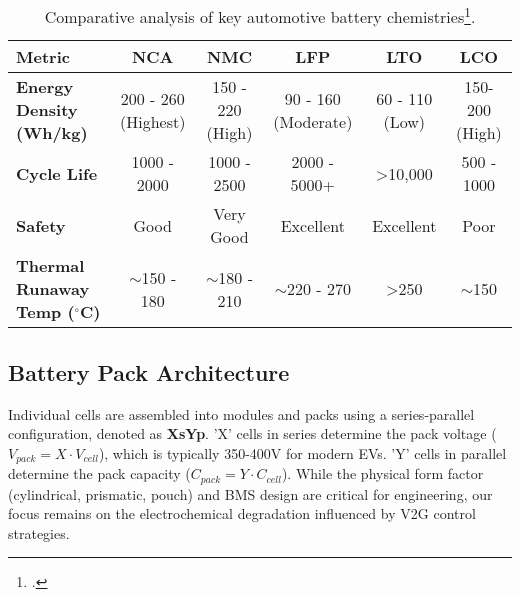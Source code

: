 \begin{table}[h!]
\centering
\caption{Comparative analysis of key automotive battery chemistries\footcite{blomgren2017development, wang2012thermal}.}
\label{tab:chem_comparison_detailed}
\begin{tabular}{@{}lccccc@{}}
\toprule
\textbf{Metric} & \textbf{NCA} & \textbf{NMC} & \textbf{LFP} & \textbf{LTO} & \textbf{LCO} \\
\midrule
\textbf{Energy Density (Wh/kg)} & 200 - 260 (Highest) & 150 - 220 (High) & 90 - 160 (Moderate) & 60 - 110 (Low) & 150-200 (High) \\
\textbf{Cycle Life} & 1000 - 2000 & 1000 - 2500 & 2000 - 5000+ & >10,000 & 500 - 1000 \\
\textbf{Safety} & Good & Very Good & Excellent & Excellent & Poor \\
\textbf{Thermal Runaway Temp ($^{\circ}$C)} & $\sim$150 - 180 & $\sim$180 - 210 & $\sim$220 - 270 & >250 & $\sim$150 \\
\bottomrule
\end{tabular}
\end{table}

\subsection{Battery Pack Architecture}
Individual cells are assembled into modules and packs using a series-parallel configuration, denoted as \textbf{XsYp}. 'X' cells in series determine the pack voltage ($V_{pack} = X \cdot V_{cell}$), which is typically 350-400V for modern EVs. 'Y' cells in parallel determine the pack capacity ($C_{pack} = Y \cdot C_{cell}$). While the physical form factor (cylindrical, prismatic, pouch) and BMS design are critical for engineering, our focus remains on the electrochemical degradation influenced by V2G control strategies.